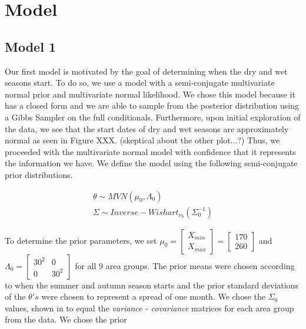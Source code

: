 \documentclass{article}
\begin{document}


\section{Model}
\subsection{Model 1}
Our first model is motivated by the goal of determining when the dry and wet seasons start. To do so, we use a model with a semi-conjugate multivariate normal prior and multivariate normal likelihood. We chose this model because it has a closed form and we are able to sample from the posterior distribution using a Gibbs Sampler on the full conditionals. Furthermore, upon initial exploration of the data, we see that the start dates of dry and wet seasons are approximately normal as seen in Figure XXX. (skeptical about the other plot...?) Thus, we proceeded with the multivariate normal model with confidence that it represents the information we have. We define the model using the following semi-conjugate prior distributions. 

\begin{align*}
\theta \sim MVN(\mu_0, \Lambda_0) \\
\Sigma \sim Inverse-Wishart_{\nu_0}(\Sigma_0^{-1})
\end{align*}

To determine the prior parameters, we set $\mu_0 = \begin{bmatrix} X_{min} \\ X_{max} \end{bmatrix} = \begin{bmatrix} 170 \\ 260 \end{bmatrix}$ and $\Lambda_0 = \begin{bmatrix} 30^2 & 0 \\ 0 & 30^2 \end{bmatrix}$ for all 9 area groups. The prior means were chosen according to when the summer and autumn season starts and the prior standard deviations of the $\theta 's$ were chosen to represent a spread of one month. We chose the $\Sigma_0$ values, shown in  to equal the \textit{variance - covariance} matrices for each area group from the data. We chose the prior 
\end{document}
